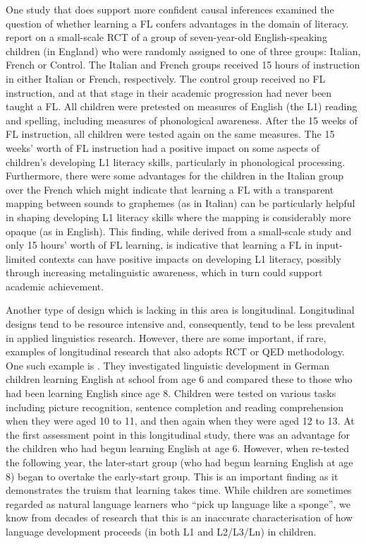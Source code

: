 \documentclass[output=paper]{langscibook}
\begin{document}
One study that does support more confident causal inferences examined the question of whether learning a FL confers advantages in the domain of literacy. \citet{MurphyEtAl2015} report on a small-scale RCT of a group of seven-year-old English-speaking children (in England) who were randomly assigned to one of three groups: Italian, French or Control. The Italian and French groups received 15 hours of instruction in either Italian or French, respectively. The control group received no FL instruction, and at that stage in their academic progression had never been taught a FL. All children were pretested on measures of English (the L1) reading and spelling, including measures of phonological awareness. After the 15 weeks of FL instruction, all children were tested again on the same measures. The 15 weeks’ worth of FL instruction had a positive impact on some aspects of children’s developing L1 literacy skills, particularly in phonological processing. Furthermore, there were some advantages for the children in the Italian group over the French which might indicate that learning a FL with a transparent mapping between sounds to graphemes (as in Italian) can be particularly helpful in shaping developing L1 literacy skills where the mapping is considerably more opaque (as in English). This finding, while derived from a small-scale study and only 15 hours’ worth of FL learning, is indicative that learning a FL in input-limited contexts can have positive impacts on developing L1 literacy, possibly through increasing metalinguistic awareness, which in turn could support academic achievement. 

Another type of design which is lacking in this area is longitudinal. Longitudinal designs tend to be resource intensive and, consequently, tend to be less prevalent in applied linguistics research. However, there are some important, if rare, examples of longitudinal research that also adopts RCT or QED methodology. One such example is \citet{JaekelEtAl2017}. They investigated linguistic development in German children learning English at school from age 6 and compared these to those who had been learning English since age 8. Children were tested on various tasks including picture recognition, sentence completion and reading comprehension when they were aged 10 to 11, and then again when they were aged 12 to 13. At the first assessment point in this longitudinal study, there was an advantage for the children who had begun learning English at age 6. However, when re-tested the following year, the later-start group (who had begun learning English at age 8) began to overtake the early-start group. This is an important finding as it demonstrates the truism that learning takes time. While children are sometimes regarded as natural language learners who ``pick up language like a sponge'', we know from decades of research that this is an inaccurate characterisation of how language development proceeds (in both L1 and L2/L3/Ln) in children. 
\end{document}
